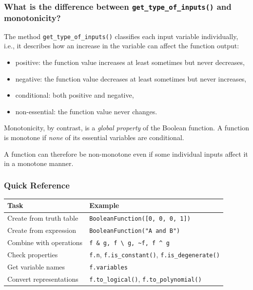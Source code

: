 \documentclass[
]{article}
\newcounter{none} %
\providecommand{\tightlist}{%
  \setlength{\itemsep}{0pt}\setlength{\parskip}{0pt}}
\begin{document}
\subsubsection{\texorpdfstring{What is the difference between
\texttt{get\_type\_of\_inputs()} and
monotonicity?}{What is the difference between get\_type\_of\_inputs() and monotonicity?}}\label{what-is-the-difference-between-get_type_of_inputs-and-monotonicity}

The method \texttt{get\_type\_of\_inputs()} classifies each input
variable individually, i.e., it describes how an increase in the
variable can affect the function output:

\begin{itemize}
\tightlist
\item
  positive: the function value increases at least sometimes but never
  decreases,
\item
  negative: the function value decreases at least sometimes but never
  increases,
\item
  conditional: both positive and negative,
\item
  non-essential: the function value never changes.
\end{itemize}

Monotonicity, by contrast, is a \emph{global property} of the Boolean
function. A function is monotone if \emph{none} of its essential
variables are conditional.

A function can therefore be non-monotone even if some individual inputs
affect it in a monotone manner.

\subsubsection{Quick Reference}\label{quick-reference}

{\def\LTcaptype{none} %
\begin{longtable}[]{@{}ll@{}}
\toprule\noalign{}
Task & Example \\
\midrule\noalign{}
\endhead
\bottomrule\noalign{}
\endlastfoot
Create from truth table &
\texttt{BooleanFunction({[}0,\ 0,\ 0,\ 1{]})} \\
Create from expression & \texttt{BooleanFunction("A\ and\ B")} \\
Combine with operations &
\texttt{f\ \&\ g,\ f\ \textbackslash{}\textbar{}\ g,\ \textasciitilde{}f,\ f\ \^{}\ g} \\
Check properties & \texttt{f.n}, \texttt{f.is\_constant()},
\texttt{f.is\_degenerate()} \\
Get variable names & \texttt{f.variables} \\
Convert representations & \texttt{f.to\_logical()},
\texttt{f.to\_polynomial()} \\
\end{longtable}
}
\end{document}
